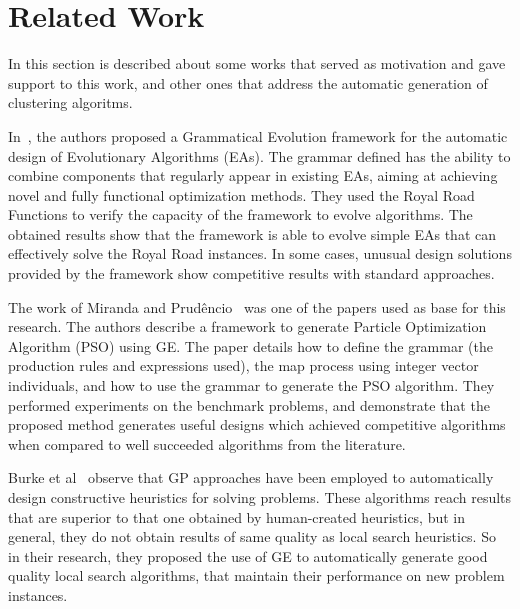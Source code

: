 \documentclass[conference]{IEEEtran}
\begin{document}
	
	
	\section{Related Work} \label{sec:related_work}
	
	In this section is described about some works that served as motivation and gave support to this work, and other ones that address the automatic generation of clustering algoritms.
	
	
	In~\cite{lourencco2012evolving,lourencco2015IEEE}, the authors proposed a Grammatical Evolution framework for the automatic design of Evolutionary Algorithms (EAs). The grammar defined has the ability to combine components that regularly appear in existing EAs, aiming at achieving novel and fully functional optimization methods. They used the Royal Road Functions to verify the capacity of the framework to evolve algorithms. The obtained results show that the framework is able to evolve simple EAs that can effectively solve the Royal Road instances. In some cases, unusual design solutions provided by the framework show competitive results with standard approaches.
	
	The work of Miranda and Prudêncio~\cite{miranda2015gefpso} was one of the papers used as base for this research. The authors describe a framework to generate Particle Optimization Algorithm (PSO) using GE. The paper details how to define the grammar (the production rules and expressions used), the map process using integer vector individuals, and how to use the grammar to generate the PSO algorithm. They performed experiments on the benchmark problems, and demonstrate that the proposed method generates useful designs which achieved competitive algorithms when compared to well succeeded algorithms from the literature.
	
	Burke et al~\cite{burke2012grammatical} observe that GP approaches have been employed to automatically design constructive heuristics for solving problems. These algorithms reach results that are superior to that one obtained by human-created heuristics, but in general, they do not obtain results of same quality as local search heuristics. So in their research, they proposed the use of GE to automatically generate good quality local search algorithms, that maintain their performance on new problem instances.
	
\end{document}
